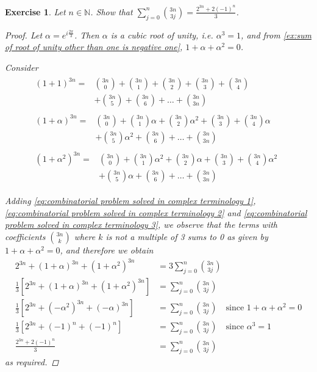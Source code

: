 \documentclass[11pt, oneside]{book}
\theoremstyle{break}
\newtheorem*{proof}{Proof}
\newtheorem{ex}{Exercise}[section]
\begin{document}
\begin{ex}
	Let $n \in \mathbb{N}$. Show that $\sum_{j=0}^{n} \binom{3n}{3j} = \frac{2^{3n} + 2(-1)^n}{3}$.

	\begin{proof}
		Let $\alpha = e^{i \frac{2\pi}{3}}$. Then $\alpha$ is a cubic root of unity, i.e. $\alpha^3 = 1$, and from \cref{ex:sum of root of unity other than one is negative one}, $1 + \alpha + \alpha^2 = 0$.

		Consider
		\begin{align}
			\begin{split}\label{eq:combinatorial problem solved in complex terminology 1}
			(1 + 1)^{3n}
				=& \binom{3n}{0} + \binom{3n}{1} + \binom{3n}{2} + \binom{3n}{3} + \binom{3n}{4} \\
				&+ \binom{3n}{5} + \binom{3n}{6} + \hdots + \binom{3n}{3n}
			\end{split} \\
			\begin{split}\label{eq:combinatorial problem solved in complex terminology 2}
			(1 + \alpha)^{3n}
				=& \binom{3n}{0} + \binom{3n}{1}\alpha + \binom{3n}{2}\alpha^2 + \binom{3n}{3} + \binom{3n}{4}\alpha \\
				&+ \binom{3n}{5}\alpha^2 + \binom{3n}{6} + \hdots + \binom{3n}{3n}
			\end{split} \\
			\begin{split}\label{eq:combinatorial problem solved in complex terminology 3}
			(1 + \alpha^2)^{3n}
				=&\binom{3n}{0} + \binom{3n}{1}\alpha^2 + \binom{3n}{2}\alpha + \binom{3n}{3} + \binom{3n}{4}\alpha^2 \\
				&+ \binom{3n}{5}\alpha + \binom{3n}{6} + \hdots + \binom{3n}{3n}
			\end{split}
			\phantom{a}
		\end{align}

		Adding \cref{eq:combinatorial problem solved in complex terminology 1}, \cref{eq:combinatorial problem solved in complex terminology 2} and \cref{eq:combinatorial problem solved in complex terminology 3}, we observe that the terms with coefficients $\binom{3n}{k}$ where $k$ is not a multiple of 3 sums to 0 as given by $1 + \alpha + \alpha^2 = 0$, and therefore we obtain
		\begin{align*}
			2^{3n} + (1 + \alpha)^{3n} + (1 + \alpha^2)^{3n} &= 3 \sum_{j=0}^{n} \binom{3n}{3j} \\
			\frac{1}{3} \left[2^{3n} + (1 + \alpha)^{3n} + (1 + \alpha^2)^{3n}\right] &= \sum_{j=0}^{n} \binom{3n}{3j} \\
			\frac{1}{3} \left[2^{3n} + (-\alpha^2)^{3n} + (-\alpha)^{3n} \right] &= \sum_{j=0}^{n} \binom{3n}{3j} \quad \text{since } 1 + \alpha + \alpha^2 = 0 \\
			\frac{1}{3} \left[2^{3n} + (-1)^n + (-1)^n \right] &= \sum_{j=0}^{n} \binom{3n}{3j} \quad \text{since } \alpha^3 = 1 \\
			\frac{2^{3n} + 2(-1)^n}{3} &= \sum_{j=0}^{n} \binom{3n}{3j}
		\end{align*}
		as required.
	\end{proof}
\end{ex}
\end{document}
